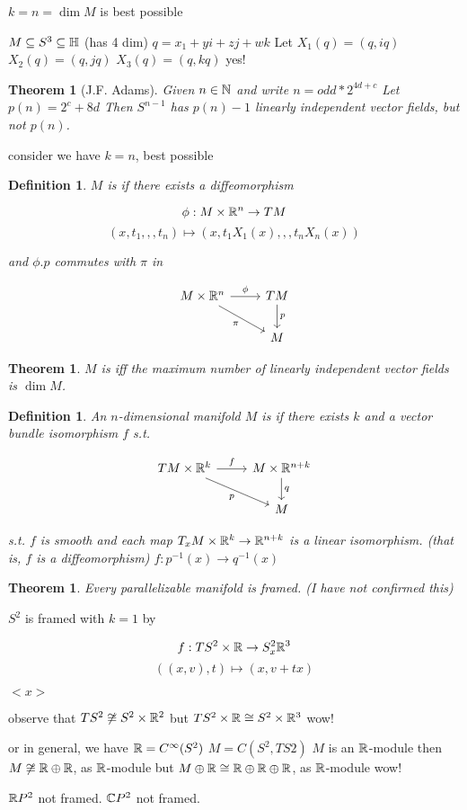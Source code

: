 \documentclass[11pt]{amsbook}
\theoremstyle{mystyle} %
\newtheorem{thrm}[thm]{Theorem}
\newtheorem{defi}[thm]{Definition}
\numberwithin{thm}{section}
\newcommand{\x}{\times}
\begin{document}
$k = n = \dim M$ is best possible

\begin{example}
	$M \subseteq S^3 \subseteq {\mathbb H}$ (has 4 dim)
	$q = x_1 + yi + zj + wk$
	Let
	$X_1(q) = (q, iq)$
	$X_2(q) = (q, jq)$
	$X_3(q) = (q, kq)$
	yes!
\end{example}
\begin{thrm}[J.F. Adams]
	Given $n \in {\mathbb N}$ and write $n = odd*2^{4d+c}$
	Let $p(n) = 2^c + 8d$
	Then $S^{n-1}$ has $p(n)-1$ linearly independent vector fields, but not $p(n)$.
\end{thrm}

consider we have $k = n$, best possible


\begin{defi}
	$M$ is  if there exists a diffeomorphism

	$$\phi : M \x \R^n \to TM$$
	$$(x, t_1,,,t_n) \mapsto (x, t_1X_1(x),,,t_nX_n(x))$$

	and $\phi.p$ commutes with $\pi$ in

	$$\begin{tikzcd}
		M \x \R^n \arrow[r, "\phi"] \arrow[rd, "\pi"'] & TM \arrow[d, "p"] \\
		 & M
	\end{tikzcd}$$

\end{defi}
\begin{thrm}
	$M$ is  iff the maximum number of linearly independent vector fields is $\dim M$.
\end{thrm}
\begin{defi}
	An $n$-dimensional manifold $M$ is  if there exists $k$ and a vector bundle isomorphism $f$ s.t.

	$$\begin{tikzcd}
		TM \x \R^k \arrow[r, "f"] \arrow[rd, "p"'] & M \x \R^{n+k} \arrow[d, "q"] \\
				   & M
	\end{tikzcd}$$

	s.t. $f$ is smooth and each map $T_xM \x \R^k \to \R^{n+k}$ is a linear isomorphism. (that is, $f$ is a diffeomorphism)
	$f: p^{-1}(x) \to q^{-1}(x)$
\end{defi}
\begin{thrm}
	Every parallelizable manifold is framed. (I have not confirmed this)
\end{thrm}
\begin{example}
	$S^2$ is framed with $k=1$ by

	$$f : TS^2 \x \R \to S^2_x \R^3$$
	$$((x,v), t) \mapsto (x, v + tx)$$

	$<x>$

	observe that
	$TS^2 \not\isom S^2 \x \R^2$
	but
	$TS^2 \x \R \isom S^2 \x \R^3$
	wow!

	or in general, we have
	${\mathbb R} = C^\infty(S^2)$
	$M = C(S^2, TS2)$
	$M$ is an ${\mathbb R}$-module
	then
	$M \not\mathrel{\cong} {\mathbb R} \oplus {\mathbb R}$, as ${\mathbb R}$-module
	but
	$M \oplus {\mathbb R} \mathrel{\cong} {\mathbb R} \oplus {\mathbb R} \oplus {\mathbb R}$, as ${\mathbb R}$-module
	wow!
\end{example}
\begin{example}
	${\mathbb R} P^2$ not framed.
	${\mathbb C} P^2$ not framed.
\end{example}
\end{document}
